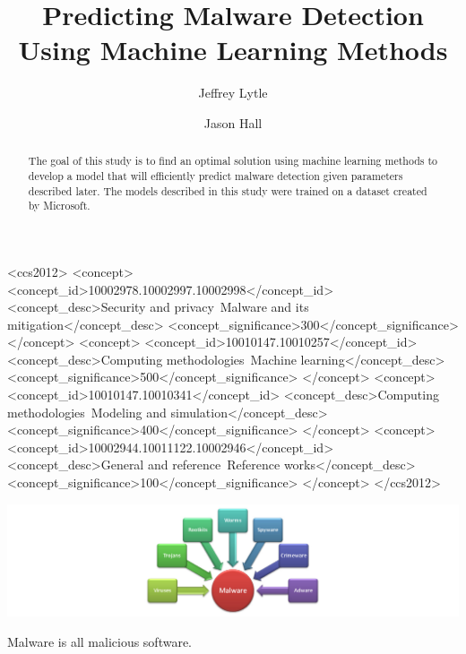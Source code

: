 \documentclass[sigconf]{acmart}
\begin{document}
%
\title{Predicting Malware Detection Using Machine Learning Methods}

\author{Jeffrey Lytle}
\author{Jason Hall}
\authornotemark[1]

\begin{abstract}
 The goal of this study is to find an optimal solution using machine learning methods to develop a model that will efficiently predict malware detection given parameters described later. The models described in this study were trained on a dataset created by Microsoft.  
\end{abstract}

\begin{CCSXML}
<ccs2012>
<concept>
<concept_id>10002978.10002997.10002998</concept_id>
<concept_desc>Security and privacy~Malware and its mitigation</concept_desc>
<concept_significance>300</concept_significance>
</concept>
<concept>
<concept_id>10010147.10010257</concept_id>
<concept_desc>Computing methodologies~Machine learning</concept_desc>
<concept_significance>500</concept_significance>
</concept>
<concept>
<concept_id>10010147.10010341</concept_id>
<concept_desc>Computing methodologies~Modeling and simulation</concept_desc>
<concept_significance>400</concept_significance>
</concept>
<concept>
<concept_id>10002944.10011122.10002946</concept_id>
<concept_desc>General and reference~Reference works</concept_desc>
<concept_significance>100</concept_significance>
</concept>
</ccs2012>
\end{CCSXML}




\begin{teaserfigure}
  \includegraphics[width=\textwidth]{malware}
  \caption{Malware is all malicious software.}
  \label{fig:teaser}
\end{teaserfigure}
\end{document}
